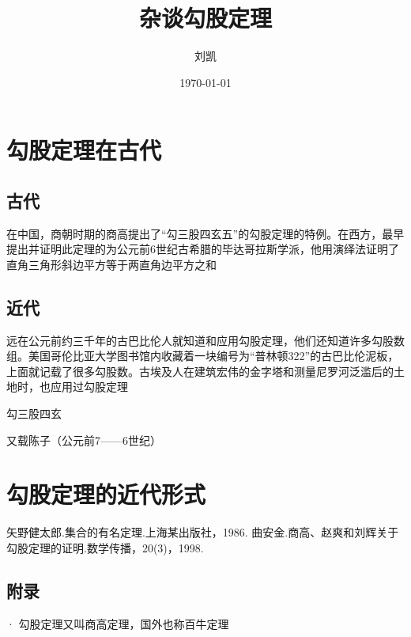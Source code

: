 \documentclass[UTF8]{ctexart}
\newtheorem{thm}{定理}
\begin{document}
\title{杂谈勾股定理}
\author{刘凯}
\date{\today}
\maketitle
\begin{abstract}
\small{}
\end{abstract}
\tableofcontents
\section{勾股定理在古代}
\subsection{古代}
\label{sec:ancient}
\small 在中国，商朝时期的商高提出了“勾三股四玄五”的勾股定理的特例。在西方，最早提出并证明此定理的为公元前6世纪古希腊的毕达哥拉斯学派，他用演绎法证明了直角三角形斜边平方等于两直角边平方之和
\subsection{近代}
\small 远在公元前约三千年的古巴比伦人就知道和应用勾股定理，他们还知道许多勾股数组。美国哥伦比亚大学图书馆内收藏着一块编号为“普林顿322”的古巴比伦泥板，上面就记载了很多勾股数。古埃及人在建筑宏伟的金字塔和测量尼罗河泛滥后的土地时，也应用过勾股定理 



\footnotesize\centering 勾三股四玄

\small 又载陈子（公元前7——6世纪）

\section{勾股定理的近代形式} 


%        
%
\begin{thebibliography}{99}
   
矢野健太郎.集合的有名定理.上海某出版社，1986.
曲安金.商高、赵爽和刘辉关于勾股定理的证明.数学传播，20(3)，1998.
\end{thebibliography}

\begin{appendix}
    \section{附录}·
\small 勾股定理又叫商高定理，国外也称百牛定理
\end{appendix}
\end{document}
